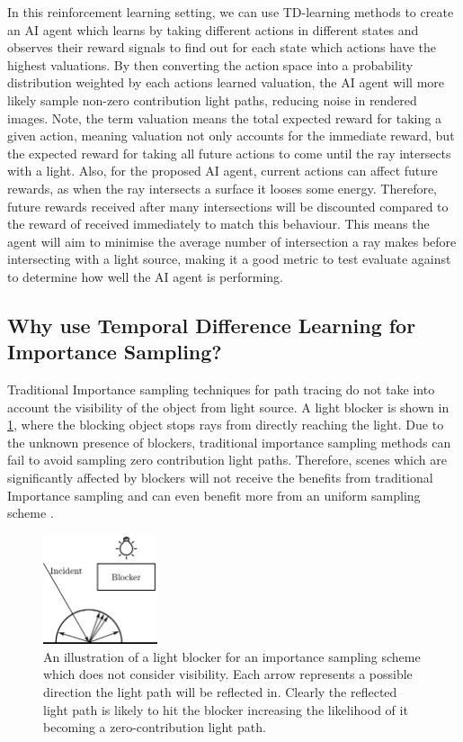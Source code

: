 \documentclass[ %
                    author={Callum Pearce},
                supervisor={Dr. Neill Campbell},
                    degree={MEng},
                     title={How effective are Temporal difference learning methods for reducing the number of zero contribution light paths, while still accurately approximating Global Illumination in Path tracing?},
                  subtitle={},
                      type={research},
                      year={2019} ]{dissertation}
\begin{document}
In this reinforcement learning setting, we can use TD-learning methods to create 
an AI agent which learns by taking different actions in different states and observes 
their reward signals to find out for each state which actions have the highest valuations.
By then converting the action space into a probability distribution weighted by each
actions learned valuation, the AI agent will more likely sample non-zero contribution 
light paths, reducing noise in rendered images. Note, the term valuation means the 
total expected reward for taking a given action, meaning valuation not only accounts 
for the immediate reward, but the expected reward for taking all future actions to come 
until the ray intersects with a light. Also, for the proposed AI agent, current actions 
can affect future rewards, as when the ray intersects a surface it looses some energy. 
Therefore, future rewards received after many intersections will be discounted 
compared to the reward of received immediately to match this behaviour. This means 
the agent will aim to minimise the average number of intersection a ray makes before 
intersecting with a light source, making it a good metric to test evaluate against to 
determine how well the AI agent is performing.

\subsection{Why use Temporal Difference Learning for Importance Sampling?}

Traditional Importance sampling techniques for path tracing do not take into account 
the visibility of the object from light source. A light blocker is shown in \ref{fig:blocker}, where the 
blocking object stops rays from directly reaching the light. Due to the unknown 
presence of blockers, traditional importance sampling methods can fail to avoid 
sampling zero contribution light paths. Therefore, scenes which are significantly 
affected by blockers will not receive the benefits from traditional Importance sampling 
and can even benefit more from an uniform sampling scheme 
\cite{ramamoorthi2012theory}.\\

\begin{figure}[h!]
\begin{center}
\includegraphics[width=0.3\textwidth]{images/light_blocker.png}    
\end{center}
\caption{An illustration of a light blocker for an importance sampling scheme which does not consider visibility. Each arrow represents a possible direction the light path will be reflected in. Clearly the reflected light path is likely to hit the blocker increasing the likelihood of it becoming a zero-contribution light path.}
\label{fig:blocker}
\end{figure}
\end{document}
